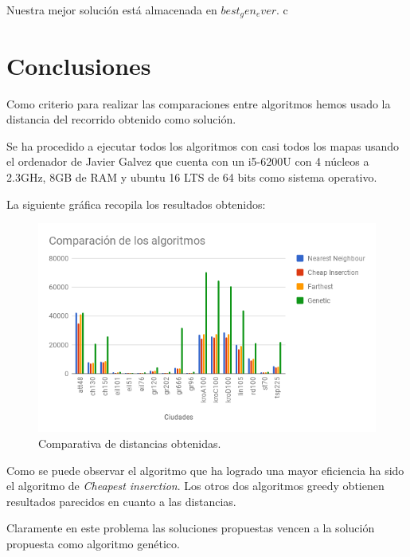 \documentclass{article}
\begin{document}
Nuestra mejor solución está almacenada en $best_gen_ever$.
c\section{Conclusiones}

Como criterio para realizar las comparaciones entre algoritmos hemos usado la
distancia del recorrido obtenido como solución.

Se ha procedido a ejecutar todos los algoritmos con casi todos los mapas
usando el ordenador de Javier Galvez que cuenta con un i5-6200U con 4
núcleos a 2.3GHz, 8GB de RAM y ubuntu 16 LTS de 64 bits como sistema
operativo.

La siguiente gráfica recopila los resultados obtenidos:

\begin{figure}[H]
  \centering
  \includegraphics[width=1\textwidth]{distancias.png}
  \caption{Comparativa de distancias obtenidas.}
\end{figure}

Como se puede observar el algoritmo que ha logrado una mayor
eficiencia ha sido el algoritmo de \textit{Cheapest inserction}. Los
otros dos algoritmos greedy obtienen resultados parecidos en cuanto a
las distancias.

Claramente en este problema las soluciones propuestas vencen a la
solución propuesta como algoritmo genético.
\end{document}
